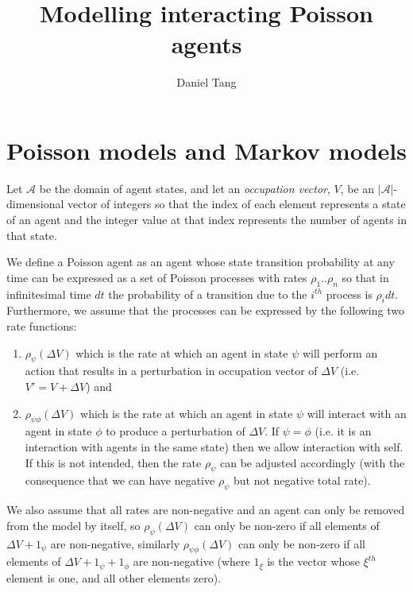 \documentclass[a4paper]{article}
\title{Modelling interacting Poisson agents}
\author{Daniel Tang}
\begin{document}
\maketitle

\section{Poisson models and Markov models}

Let $\mathcal{A}$ be the domain of agent states, and let an \textit{occupation vector}, $V$, be an $|\mathcal{A}|$-dimensional vector of integers so that the index of each element represents a state of an agent and the integer value at that index represents the number of agents in that state.

We define a Poisson agent as an agent whose state transition probability at any time can be expressed as a set of Poisson processes with rates $\rho_1..\rho_n$ so that in infinitesimal time $dt$ the probability of a transition due to the $i^{th}$ process is $\rho_i dt$. Furthermore, we assume that the processes can be expressed by the following two rate functions:
\begin{enumerate}
	\item $\rho_\psi(\Delta V)$ which is the rate at which an agent in state $\psi$ will perform an action that results in a perturbation in occupation vector of $\Delta V$ (i.e. $V' = V + \Delta V$) and
	
	\item $\rho_{\psi\phi}(\Delta V)$ which is the rate at which an agent in state $\psi$ will interact with an agent in state $\phi$ to produce a perturbation of $\Delta V$. If $\psi = \phi$ (i.e. it is an interaction with agents in the same state) then we allow interaction with self. If this is not intended, then the rate $\rho_\psi$ can be adjusted accordingly (with the consequence that we can have negative $\rho_\psi$ but not negative total rate).
\end{enumerate}

We also assume that all rates are non-negative and an agent can only be removed from the model by itself, so $\rho_\psi(\Delta V)$ can only be non-zero if all elements of $\Delta V + 1_\psi$ are non-negative, similarly $\rho_{\psi\phi}(\Delta V)$ can only be non-zero if all elements of $\Delta V + 1_\psi + 1_\phi$ are non-negative (where $1_\xi$ is the vector whose $\xi^{th}$ element is one, and all other elements zero).
\end{document}
